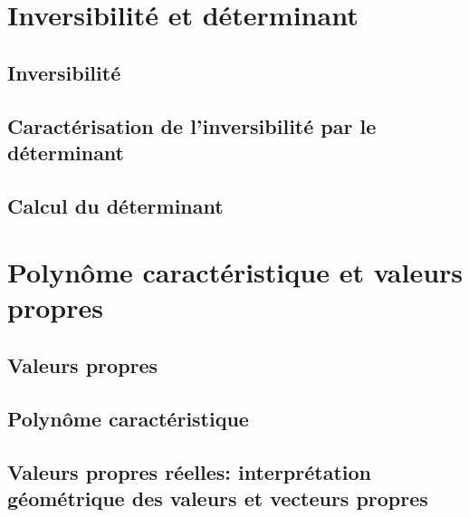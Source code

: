 \documentclass[french, 12pt]{report}
\numberwithin{exercise}{section}
\numberwithin{equation}{section}
\begin{document}
\section{Inversibilité et déterminant}

\subsection{Inversibilité}

\subsection{Caractérisation de l'inversibilité par le déterminant}

\subsection{Calcul du déterminant}

\section{Polynôme caractéristique et valeurs propres}

\subsection{Valeurs propres}

\subsection{Polynôme caractéristique}

\subsection{Valeurs propres réelles: interprétation géométrique des valeurs et vecteurs propres}
\end{document}
